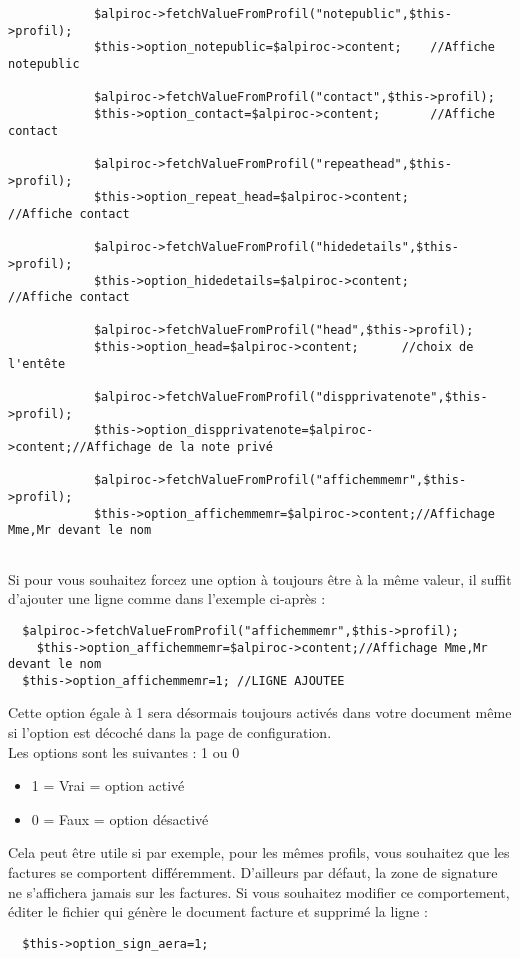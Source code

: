 \documentclass[a4paper,11pt]{article}
\begin{document}
\begin{verbatim}
			$alpiroc->fetchValueFromProfil("notepublic",$this->profil);
			$this->option_notepublic=$alpiroc->content;	   //Affiche notepublic
			
			$alpiroc->fetchValueFromProfil("contact",$this->profil);
			$this->option_contact=$alpiroc->content;	   //Affiche contact
			
			$alpiroc->fetchValueFromProfil("repeathead",$this->profil);
			$this->option_repeat_head=$alpiroc->content;	   //Affiche contact

			$alpiroc->fetchValueFromProfil("hidedetails",$this->profil);
			$this->option_hidedetails=$alpiroc->content;	   //Affiche contact
			
			$alpiroc->fetchValueFromProfil("head",$this->profil);
			$this->option_head=$alpiroc->content;	   //choix de l'entête
			
			$alpiroc->fetchValueFromProfil("dispprivatenote",$this->profil);
			$this->option_dispprivatenote=$alpiroc->content;//Affichage de la note privé
			
			$alpiroc->fetchValueFromProfil("affichemmemr",$this->profil);
			$this->option_affichemmemr=$alpiroc->content;//Affichage Mme,Mr devant le nom
			
\end{verbatim}
Si pour vous souhaitez forcez une option à toujours être à la même valeur, il suffit d'ajouter une ligne comme dans l'exemple ci-après :
\begin{verbatim}
  $alpiroc->fetchValueFromProfil("affichemmemr",$this->profil);
	$this->option_affichemmemr=$alpiroc->content;//Affichage Mme,Mr devant le nom
  $this->option_affichemmemr=1; //LIGNE AJOUTEE
\end{verbatim}

Cette option égale à 1 sera désormais toujours activés dans votre document même si l'option est décoché dans la page de configuration.\\
Les options sont les suivantes  : 1 ou 0
\begin{itemize}
  \item 1 = Vrai = option activé
  \item 0 = Faux = option désactivé
\end{itemize}

Cela peut être utile si par exemple, pour les mêmes profils, vous souhaitez que les factures se comportent différemment. D'ailleurs par défaut, la zone de signature ne s'affichera jamais sur les factures. Si vous souhaitez modifier ce comportement, éditer le fichier qui génère le document facture et supprimé la ligne :
\begin{verbatim}
  $this->option_sign_aera=1;
\end{verbatim}
\end{document}
